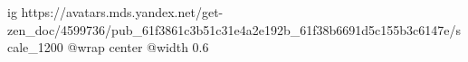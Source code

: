  
 
 
 
 

\ifcmt
  ig https://avatars.mds.yandex.net/get-zen_doc/4599736/pub_61f3861c3b51c31e4a2e192b_61f38b6691d5c155b3c6147e/scale_1200
	@wrap center
	@width 0.6
\fi
